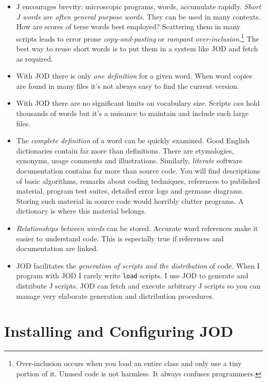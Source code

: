 \begin{itemize}
	\item J encourages brevity: microscopic programs, words, accumulate rapidly.  
	\emph{Short J words are often general purpose words. } They can be used in many contexts.  How  
	are scores of terse words best employed? Scattering them in many scripts leads
	to error prone \emph{copy-and-pasting} or 
	 \emph{rampant over-inclusion}.\footnote{Over-inclusion occurs when you load 
	an entire class and only use a tiny portion of it.  Unused code is not harmless. It always confuses programmers.}  
	 The best way to reuse short words is to put
	 them in a system like JOD and fetch as required.   
	\item With JOD there is only \emph{one definition} for a given word. When word copies are
	 found in many files it's not always easy to find the current version.
	\item With JOD there are no significant limits on vocabulary size.  Scripts \emph{can} hold thousands
	of words but it's a nuisance to maintain and include such large files.
	\item The \emph{complete definition} of a word can 
	be quickly examined.  Good English dictionaries contain far more than
	definitions.  There are etymologies, synonyms, usage comments and illustrations.  Similarly,
	\emph{literate} software documentation contains far more than source code.  You will find
	descriptions of basic algorithms, remarks about coding techniques, references to
	published material, program test suites, detailed error
	logs and germane diagrams. Storing such material in source code would 
	horribly clutter programs.  A dictionary is where this material belongs.
	\item \emph{Relationships between words} can be stored.  Accurate word references
	 make it easier to understand code.  This is especially true if references 
	  and documentation are linked. 
	\item JOD facilitates the \emph{generation of scripts and the distribution} of code. When I
	program with JOD I rarely write \texttt{load} scripts.  I use JOD to generate and distribute
  J scripts.  JOD can fetch and execute arbitrary J scripts so you can manage
  very elaborate generation and distribution procedures.
\end{itemize}

\section{Installing and Configuring JOD}

